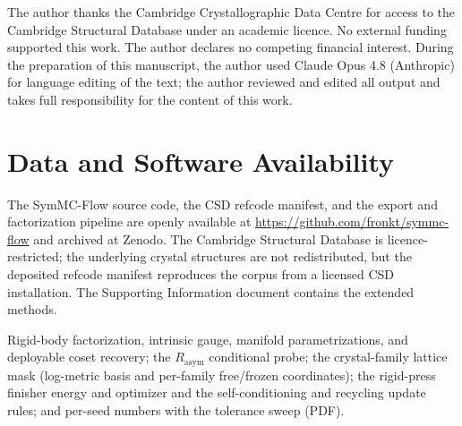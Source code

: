 \documentclass[journal=acsodf,manuscript=article]{achemso}
\begin{document}
\begin{acknowledgement}
The author thanks the Cambridge Crystallographic Data Centre for access to the
Cambridge Structural Database under an academic licence. No external funding
supported this work. The author declares no competing financial interest. During
the preparation of this manuscript, the author used Claude Opus 4.8 (Anthropic)
for language editing of the text; the author reviewed and edited all output and
takes full responsibility for the content of this work.
\end{acknowledgement}

\section*{Data and Software Availability}
The SymMC-Flow source code, the CSD refcode manifest, and the export and
factorization pipeline are openly available at
\url{https://github.com/fronkt/symmc-flow} and archived at
Zenodo\cite{cai2026symmcflow}. The Cambridge Structural Database is
licence-restricted; the underlying crystal structures are not redistributed, but
the deposited refcode manifest reproduces the corpus from a licensed CSD
installation. The Supporting Information document contains the extended methods.

\begin{suppinfo}
Rigid-body factorization, intrinsic gauge, manifold parametrizations, and
deployable coset recovery; the $R_{\text{asym}}$ conditional probe; the
crystal-family lattice mask (log-metric basis and per-family free/frozen
coordinates); the rigid-press finisher energy and optimizer and the
self-conditioning and recycling update rules; and per-seed numbers with the
tolerance sweep (PDF).
\end{suppinfo}


\end{document}
